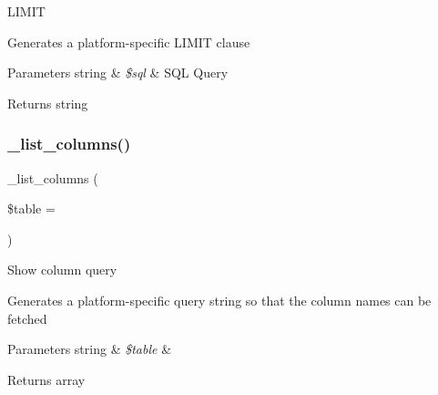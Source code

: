 L\+I\+M\+IT

Generates a platform-\/specific L\+I\+M\+IT clause


\begin{DoxyParams}[1]{Parameters}
string & {\em \$sql} & S\+QL Query \\
\hline
\end{DoxyParams}
\begin{DoxyReturn}{Returns}
string 
\end{DoxyReturn}
\mbox{\label{class_c_i___d_b__pdo__ibm__driver_a7ccb7f9c301fe7f0a9db701254142b63}} 
\subsubsection{\texorpdfstring{\+\_\+list\+\_\+columns()}{\_list\_columns()}}
{\footnotesize\ttfamily \+\_\+list\+\_\+columns (\begin{DoxyParamCaption}\item[{}]{\$table = {\ttfamily \textquotesingle{}\textquotesingle{}} }\end{DoxyParamCaption})\hspace{0.3cm}{\ttfamily [protected]}}

Show column query

Generates a platform-\/specific query string so that the column names can be fetched


\begin{DoxyParams}[1]{Parameters}
string & {\em \$table} & \\
\hline
\end{DoxyParams}
\begin{DoxyReturn}{Returns}
array 
\end{DoxyReturn}
\mbox{\label{class_c_i___d_b__pdo__ibm__driver_a435c0f3ce54fe7daa178baa8532ebd54}} 
